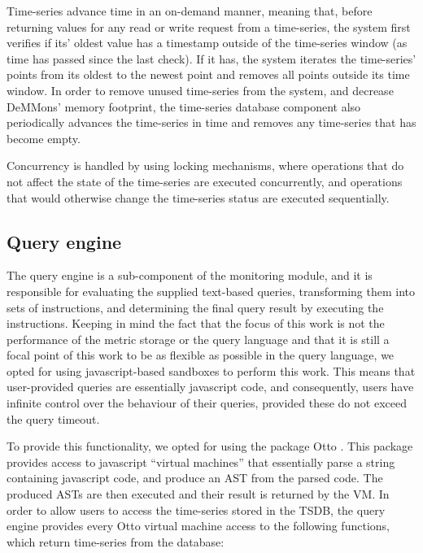 Time-series advance time in an on-demand manner, meaning that, before returning values for any read or write request from a time-series, the system first verifies if its' oldest value has a timestamp outside of the time-series window (as time has passed since the last check). If it has, the system iterates the time-series' points from its oldest to the newest point and removes all points outside its time window. In order to remove unused time-series from the system, and decrease DeMMons' memory footprint, the time-series database component also periodically advances the time-series in time and removes any time-series that has become empty.

Concurrency is handled by using locking mechanisms, where operations that do not affect the state of the time-series are executed concurrently, and operations that would otherwise change the time-series status are executed sequentially. 

\subsection{Query engine} \label{sec:mon_module:query_engine}

The query engine is a sub-component of the monitoring module, and it is responsible for evaluating the supplied text-based queries, transforming them into sets of instructions, and determining the final query result by executing the instructions. Keeping in mind the fact that the focus of this work is not the performance of the metric storage or the query language and that it is still a focal point of this work to be as flexible as possible in the query language, we opted for using javascript-based sandboxes to perform this work. This means that user-provided queries are essentially javascript code, and consequently, users have infinite control over the behaviour of their queries, provided these do not exceed the query timeout.

To provide this functionality, we opted for using the package Otto \cite{otto}. This package provides access to javascript ``virtual machines'' that essentially parse a string containing javascript code, and produce an AST from the parsed code. The produced ASTs are then executed and their result is returned by the VM. In order to allow users to access the time-series stored in the TSDB, the query engine provides every Otto virtual machine access to the following functions, which return time-series from the database:

